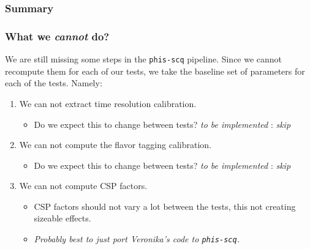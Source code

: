 \documentclass[9pt,aspectratio=43]{beamer}
\begin{document}
%
\begin{frame}[default]
\frametitle{Summary}
\frametitle{What we \textit{cannot} do?}

We are still missing some steps in the \texttt{phis-scq} pipeline.
Since we cannot recompute them for each of our tests, we take the
baseline set  of parameters for each of the tests.
Namely:

\medskip

\begin{enumerate}
  \addtocounter{enumi}{2}
  \item We can not extract time resolution calibration.
    \begin{itemize}
      \item Do we expect this to change between tests? \emph{to be implemented} : \emph{skip} 
    \end{itemize}
  \addtocounter{enumi}{1}
  \item We can not compute the flavor tagging calibration.
    \begin{itemize}
      \item Do we expect this to change between tests? \emph{to be implemented} : \emph{skip}
    \end{itemize}
  \item We can not compute CSP factors.
    \begin{itemize}
      \item CSP factors should not vary a lot between the tests, this not creating sizeable effects.
      \item \emph{Probably best to just port Veronika's code to \texttt{phis-scq}.}
    \end{itemize}
\end{enumerate}

\end{frame}
%
\end{document}
